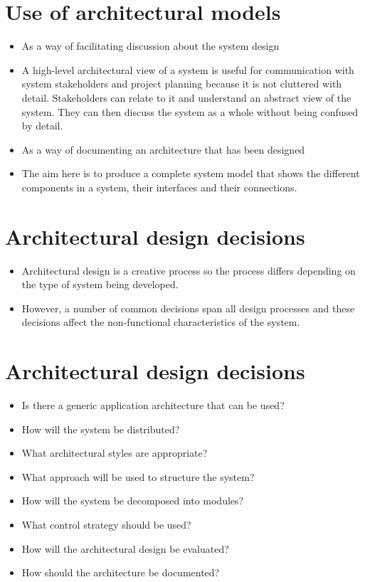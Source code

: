 \section{Use of architectural models}
\begin{itemize}

\item As a way of facilitating discussion about the system design

 \item A high-level architectural view of a system is useful for communication with system stakeholders and project planning because it is not cluttered with detail. Stakeholders can relate to it and understand an abstract view of the system. They can then discuss the system as a whole without being confused by detail.

\item As a way of documenting an architecture that has been designed

 \item The aim here is to produce a complete system model that shows the different components in a system, their interfaces and their connections.
\end{itemize}
\section{Architectural design decisions}
\begin{itemize}

\item Architectural design is a creative process so the process differs depending on the type of system being developed.

\item However, a number of common decisions span all design processes and these decisions affect the non-functional characteristics of the system.
\end{itemize}
\section{Architectural design decisions}
\begin{itemize}

\item Is there a generic application architecture that can be used?

\item How will the system be distributed?

\item What architectural styles are appropriate?

\item What approach will be used to structure the system?

\item How will the system be decomposed into modules?

\item What control strategy should be used?

\item How will the architectural design be evaluated?

\item How should the architecture be documented?

\end{itemize}
